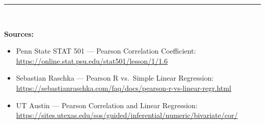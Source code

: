\documentclass[11pt,a4paper]{article}
\begin{document}
\vfill
\noindent\rule{\textwidth}{0.4pt}\\[4pt]
{\small
\textbf{Sources:}
\begin{itemize}[nosep,leftmargin=*]
  \item Penn State STAT 501 --- Pearson Correlation Coefficient:
        \url{https://online.stat.psu.edu/stat501/lesson/1/1.6}
  \item Sebastian Raschka --- Pearson R vs.\ Simple Linear Regression:
        \url{https://sebastianraschka.com/faq/docs/pearson-r-vs-linear-regr.html}
  \item UT Austin --- Pearson Correlation and Linear Regression:
        \url{https://sites.utexas.edu/sos/guided/inferential/numeric/bivariate/cor/}
\end{itemize}
}
\end{document}
